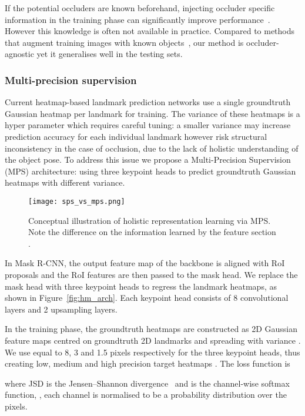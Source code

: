 \documentclass[10pt,twocolumn,letterpaper]{article}
\begin{document}
If the potential occluders are known beforehand, injecting  occluder specific information in the training phase can significantly improve performance~\cite{Oberweger2018making}. However this knowledge is often not available in practice. Compared to methods that augment training images with known objects~\cite{Jafari2018ipose, li2017deep, alhaija2017augmented}, our method is occluder-agnostic yet it generalises well in the testing sets. 


\subsubsection{Multi-precision supervision}

Current heatmap-based landmark prediction networks use a single groundtruth Gaussian heatmap per landmark for training. The variance of these heatmaps is a hyper parameter which requires careful tuning: a smaller variance may increase prediction accuracy for each individual landmark however risk structural inconsistency in the case of occlusion, due to the lack of holistic understanding of the object pose. To address this issue we propose a Multi-Precision Supervision (MPS) architecture: using three keypoint heads to predict groundtruth Gaussian heatmaps with different variance. 

\begin{figure}[t]
    \centering
    \texttt{[image: sps\_vs\_mps.png]}
    \caption{Conceptual illustration of holistic representation learning via MPS. Note the difference on the information learned by the feature section .}
    \label{fig:sps_vs_mps}
\end{figure}


In Mask R-CNN, the output feature map of the backbone is aligned with RoI proposals and the RoI features are then passed to the mask head. We replace the mask head with three keypoint heads to regress the landmark heatmaps, as shown in Figure~\ref{fig:hm_arch}. Each keypoint head consists of 8 convolutional layers and 2 upsampling layers. 

In the training phase, the groundtruth heatmaps  are constructed as 2D Gaussian feature maps centred on groundtruth 2D landmarks  and spreading with variance . We use  equal to 8, 3 and 1.5 pixels respectively for the three keypoint heads, thus creating low, medium and high precision target heatmaps . The loss function is

where JSD is the Jensen–Shannon divergence~\cite{Fuglede2004jensen} and  is the channel-wise softmax function, \ie, each channel is normalised to be a probability distribution over the pixels. 
\end{document}
